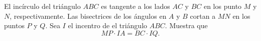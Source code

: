 El incírculo del triángulo $ABC$ es tangente a los lados $AC$ y $BC$ en los punto $M$ y $N$, respectivamente. Las bisectrices de los ángulos en $A$ y $B$ cortan a $MN$ en los puntos $P$ y $Q$. Sea $I$ el incentro de el triángulo $ABC$. Muestra que
\[MP\cdot IA=BC\cdot IQ.\]